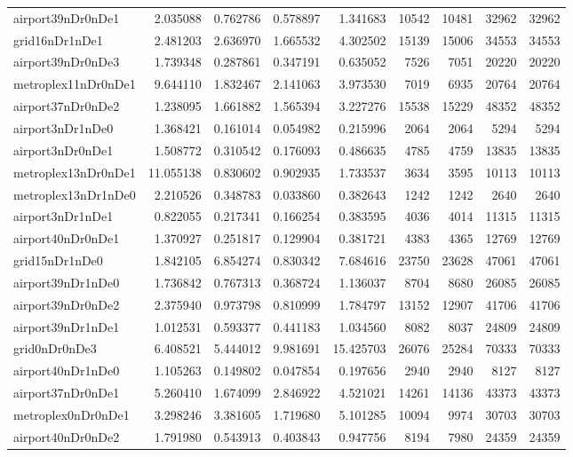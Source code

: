 \begin{longtable}{|l|r|r|r|r|r|r|r|r|}
airport39nDr0nDe1 & 2.035088 & 0.762786 & 0.578897 & 1.341683 & 10542 & 10481 & 32962 & 32962 \\
grid16nDr1nDe1 & 2.481203 & 2.636970 & 1.665532 & 4.302502 & 15139 & 15006 & 34553 & 34553 \\
airport39nDr0nDe3 & 1.739348 & 0.287861 & 0.347191 & 0.635052 & 7526 & 7051 & 20220 & 20220 \\
metroplex11nDr0nDe1 & 9.644110 & 1.832467 & 2.141063 & 3.973530 & 7019 & 6935 & 20764 & 20764 \\
airport37nDr0nDe2 & 1.238095 & 1.661882 & 1.565394 & 3.227276 & 15538 & 15229 & 48352 & 48352 \\
airport3nDr1nDe0 & 1.368421 & 0.161014 & 0.054982 & 0.215996 & 2064 & 2064 & 5294 & 5294 \\
airport3nDr0nDe1 & 1.508772 & 0.310542 & 0.176093 & 0.486635 & 4785 & 4759 & 13835 & 13835 \\
metroplex13nDr0nDe1 & 11.055138 & 0.830602 & 0.902935 & 1.733537 & 3634 & 3595 & 10113 & 10113 \\
metroplex13nDr1nDe0 & 2.210526 & 0.348783 & 0.033860 & 0.382643 & 1242 & 1242 & 2640 & 2640 \\
airport3nDr1nDe1 & 0.822055 & 0.217341 & 0.166254 & 0.383595 & 4036 & 4014 & 11315 & 11315 \\
airport40nDr0nDe1 & 1.370927 & 0.251817 & 0.129904 & 0.381721 & 4383 & 4365 & 12769 & 12769 \\
grid15nDr1nDe0 & 1.842105 & 6.854274 & 0.830342 & 7.684616 & 23750 & 23628 & 47061 & 47061 \\
airport39nDr1nDe0 & 1.736842 & 0.767313 & 0.368724 & 1.136037 & 8704 & 8680 & 26085 & 26085 \\
airport39nDr0nDe2 & 2.375940 & 0.973798 & 0.810999 & 1.784797 & 13152 & 12907 & 41706 & 41706 \\
airport39nDr1nDe1 & 1.012531 & 0.593377 & 0.441183 & 1.034560 & 8082 & 8037 & 24809 & 24809 \\
grid0nDr0nDe3 & 6.408521 & 5.444012 & 9.981691 & 15.425703 & 26076 & 25284 & 70333 & 70333 \\
airport40nDr1nDe0 & 1.105263 & 0.149802 & 0.047854 & 0.197656 & 2940 & 2940 & 8127 & 8127 \\
airport37nDr0nDe1 & 5.260410 & 1.674099 & 2.846922 & 4.521021 & 14261 & 14136 & 43373 & 43373 \\
metroplex0nDr0nDe1 & 3.298246 & 3.381605 & 1.719680 & 5.101285 & 10094 & 9974 & 30703 & 30703 \\
airport40nDr0nDe2 & 1.791980 & 0.543913 & 0.403843 & 0.947756 & 8194 & 7980 & 24359 & 24359 \\

\end{longtable}

